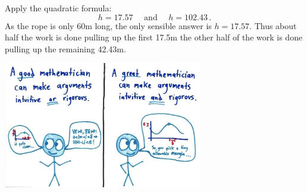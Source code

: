 \begin{example}
\begin{enumerate}
Apply the quadratic formula:
\[h =17.57 \quad \text{ and } \quad h= 102.43\,. \]
As the rope is only 60m long, the only sensible answer is $h=17.57$. Thus about half the work is done pulling up the first 17.5m the other half of the work is done pulling up the remaining 42.43m. 
\end{enumerate}
\end{example}

	\begin{center}
			\includegraphics[width=0.65\textwidth]{GreatMath_4.jpg}
	\end{center}

 




